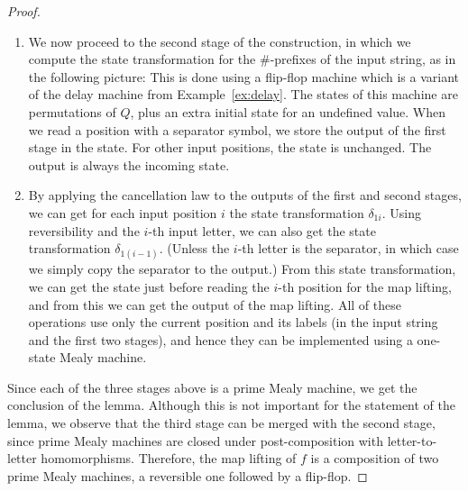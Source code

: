 \begin{proof}
\begin{enumerate}
        Here is  a picture of the first stage. In the picture, we use hexadecimal for indexing positions (so that we can have more  single digit indexes) and we write  $\delta_{ij}$ for the state transformation which corresponds to the infix of the input string that begins in the $i$-th position and ends in the $j$-th position, including both endpoints:
        \item We now proceed to the second stage of the construction, in which we compute the state transformation for the $\#$-prefixes of the input string, as in the following picture:
        This is done using a flip-flop machine which is a  variant of the delay machine from Example~\ref{ex:delay}. The states of this machine are permutations of $Q$, plus an extra initial state for an undefined value. When we read a position with a separator symbol, we store the output of the first stage in the state. For other input positions, the state is unchanged. The output is always the incoming state. 
        \item By applying the cancellation law to the outputs of the first and second stages, we can get for each input position $i$ the state transformation $\delta_{1i}$. Using reversibility and the $i$-th input letter, we can also get the state transformation $\delta_{1(i-1)}$. (Unless the $i$-th letter is the separator, in which case we simply copy the separator to the output.) From this state transformation, we can get the state just before reading the $i$-th position for the map lifting, and from this we can get the output of the map lifting. All of these operations use only the current position and its labels (in the input string and the first two stages), and hence they can be implemented using a one-state Mealy machine.
    \end{enumerate}
    Since each of the three stages above is a prime Mealy machine, we get the conclusion of the lemma. Although this is not important for the statement of the lemma, we observe that the third stage can be merged with the second stage, since prime Mealy machines are closed under post-composition with letter-to-letter homomorphisms. Therefore, the map lifting of $f$ is a composition of two prime Mealy machines, a reversible one followed by a flip-flop.
\end{proof}

